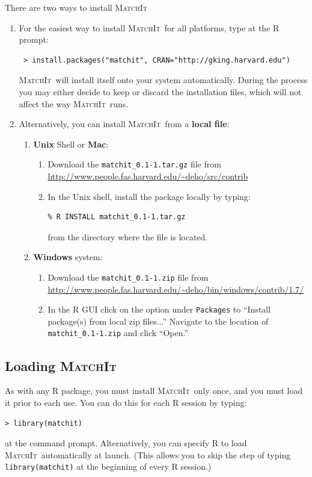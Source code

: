 \documentclass[oneside,letterpaper,titlepage]{article}
\newcommand{\MatchIt}{\textsc{MatchIt}}
\begin{document}
There are two ways to install \MatchIt\: 

\begin{enumerate} 
\item For the easiest way to install \MatchIt\ for all platforms,
  type at the R prompt:
\begin{verbatim}
 > install.packages("matchit", CRAN="http://gking.harvard.edu")
\end{verbatim}

  \noindent \MatchIt\ will  install itself onto
  your system automatically.  During the process you may either decide
  to keep or discard the installation files, which will not affect the
  way \MatchIt\ runs.

\item Alternatively, you can install \MatchIt\ from a \textbf{local file}:
  \begin{enumerate} 
  \item \textbf{Unix} Shell or \textbf{Mac}:
    \begin{enumerate}
    \item Download the \texttt{matchit\_0.1-1.tar.gz} file from
      \url{http://www.people.fas.harvard.edu/~deho/src/contrib}
    \item In the Unix shell, install the package locally by typing:
\begin{verbatim}
% R INSTALL matchit_0.1-1.tar.gz   
\end{verbatim}
      from the directory where the file is located.
    \end{enumerate}
  \item \textbf{Windows} system:
    \begin{enumerate}
    \item Download the \texttt{matchit\_0.1-1.zip} file from 
      \url{http://www.people.fas.harvard.edu/~deho/bin/windows/contrib/1.7/}
    \item In the R GUI click on the option under \texttt{Packages} to
      ``Install package(s) from local zip files...''  Navigate to the
      location of \texttt{matchit\_0.1-1.zip} and click ``Open.''
    \end{enumerate}
  \end{enumerate}
\end{enumerate}

\subsection{Loading \MatchIt}
As with any R package, you must install \MatchIt\ only once, and you
must load it prior to each use.  You can do this for each R session by
typing:
\begin{verbatim}
> library(matchit) 
\end{verbatim}
at the command prompt.  Alternatively, you can specify R to load
\MatchIt\ automatically at launch.  (This allows you to skip the step
of typing {\tt library(matchit)} at the beginning of every R session.)
 
\end{document}
